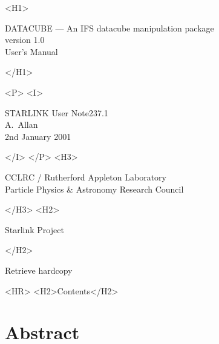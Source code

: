 \documentclass[twoside,11pt]{article}
\newcommand{\stardoccategory}  {STARLINK User Note}
\newcommand{\stardocsource}    {sun\stardocnumber}
\newcommand{\stardocnumber}    {237.1}
\newcommand{\stardocauthors}   {A.~Allan}
\newcommand{\stardocdate}      {2nd January 2001}
\newcommand{\stardoctitle}     {DATACUBE --- An IFS datacube manipulation package}
\newcommand{\stardocversion}   {version 1.0}
\newcommand{\stardocmanual}    {User's Manual}
\newcommand{\htmladdnormallink}[2]{#1}
\newcommand{\htmladdimg}[1]{}
\newcommand{\htmlref}[2]{#1}
\newcommand{\htmladdtonavigation}[1]{}
\newcommand{\xlabel}[1]{}
\newcommand{\latexonlytoc}[0]{\tableofcontents}
\begin{document}
\begin{htmlonly}
   \xlabel{}
   \begin{rawhtml} <H1> \end{rawhtml}
      \stardoctitle\\
      \stardocversion\\
      \stardocmanual
   \begin{rawhtml} </H1> \end{rawhtml}

   \htmladdimg{sun237_cover.gif}


   \begin{rawhtml} <P> <I> \end{rawhtml}
   \stardoccategory \stardocnumber \\
   \stardocauthors \\
   \stardocdate
   \begin{rawhtml} </I> </P> <H3> \end{rawhtml}
      \htmladdnormallink{CCLRC}{http://www.cclrc.ac.uk} /
      \htmladdnormallink{Rutherford Appleton Laboratory}
                        {http://www.cclrc.ac.uk/ral} \\
      \htmladdnormallink{Particle Physics \& Astronomy Research Council}
                        {http://www.pparc.ac.uk} \\
   \begin{rawhtml} </H3> <H2> \end{rawhtml}
      \htmladdnormallink{Starlink Project}{http://star-www.rl.ac.uk/}
   \begin{rawhtml} </H2> \end{rawhtml}
   \htmladdnormallink{\htmladdimg{source.gif} Retrieve hardcopy}
      {http://star-www.rl.ac.uk/cgi-bin/hcserver?\stardocsource}\\

  \label{stardoccontents}
  \begin{rawhtml} 
    <HR>
    <H2>Contents</H2>
  \end{rawhtml}
  \renewcommand{\latexonlytoc}[0]{}

  \section{\xlabel{abstract}Abstract}
\end{htmlonly}
\end{document}
